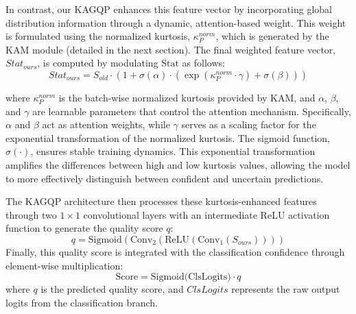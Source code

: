 In contrast, our KAGQP enhances this feature vector by incorporating global distribution information through a dynamic, attention-based weight. This weight is formulated using the normalized kurtosis, $\kappa_P^{norm}$, which is generated by the KAM module (detailed in the next section). The final weighted feature vector, $Stat_{ours}$, is computed by modulating $\text{Stat}$ as follows:
\begin{equation}
Stat_{ours} = S_{old} \cdot \left(1 + \sigma(\alpha) \cdot (\exp(\kappa_P^{norm} \cdot \gamma) + \sigma(\beta))\right)
\end{equation}

where $\kappa_P^{norm}$ is the batch-wise normalized kurtosis provided by KAM, and $\alpha$, $\beta$, and $\gamma$ are learnable parameters that control the attention mechanism. Specifically, $\alpha$ and $\beta$ act as attention weights, while $\gamma$ serves as a scaling factor for the exponential transformation of the normalized kurtosis. The sigmoid function, $\sigma(\cdot)$, ensures stable training dynamics. This exponential transformation amplifies the differences between high and low kurtosis values, allowing the model to more effectively distinguish between confident and uncertain predictions.

%
The KAGQP architecture then processes these kurtosis-enhanced features through two $1 \times 1$ convolutional layers with an intermediate ReLU activation function to generate the quality score $q$:
\begin{equation}
q=\text{Sigmoid}\left(\text{Conv}_2\left(\text{ReLU}\left(\text{Conv}_1(S_{ours})\right)\right)\right)
\end{equation}
Finally, this quality score is integrated with the classification confidence through element-wise multiplication:
\begin{equation}
\text{Score} = \text{Sigmoid(ClsLogits)} \cdot q
\end{equation}
where $q$ is the predicted quality score, and $ClsLogits$ represents the raw output logits from the classification branch.

